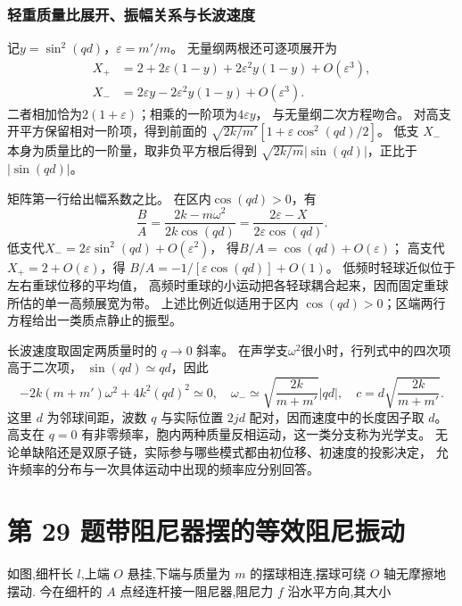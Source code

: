 \documentclass[UTF8,fontset=fandol,a4paper,11pt]{ctexart}
\newcommand{\tagline}[1]{\noindent{\small\color{muted}#1}\par}
\begin{document}
\subsubsection*{轻重质量比展开、振幅关系与长波速度}
记$y=\sin^2(qd)$，$\varepsilon=m'/m$。
无量纲两根还可逐项展开为
\[
\begin{aligned}
X_+&=2+2\varepsilon(1-y)+2\varepsilon^2y(1-y)+O(\varepsilon^3),\\
X_-&=2\varepsilon y-2\varepsilon^2y(1-y)+O(\varepsilon^3).
\end{aligned}
\]
二者相加恰为$2(1+\varepsilon)$；相乘的一阶项为$4\varepsilon y$，
与无量纲二次方程吻合。
对高支开平方保留相对一阶项，得到前面的
$\sqrt{2k/m'}[1+\varepsilon\cos^2(qd)/2]$。
低支 $X_-$ 本身为质量比的一阶量，取非负平方根后得到 $\sqrt{2k/m}|\sin(qd)|$，正比于 $|\sin(qd)|$。

矩阵第一行给出幅系数之比。
在区内$\cos(qd)>0$，有
\[
\frac BA=\frac{2k-m\omega^2}{2k\cos(qd)}
=\frac{2\varepsilon-X}{2\varepsilon\cos(qd)}.
\]
低支代$X_-=2\varepsilon\sin^2(qd)+O(\varepsilon^2)$，
得$B/A=\cos(qd)+O(\varepsilon)$；
高支代$X_+=2+O(\varepsilon)$，得
$B/A=-1/[\varepsilon\cos(qd)]+O(1)$。
低频时轻球近似位于左右重球位移的平均值，
高频时重球的小运动把各轻球耦合起来，因而固定重球所估的单一高频展宽为带。
上述比例近似适用于区内 $\cos(qd)>0$；区端两行方程给出一类质点静止的振型。

长波速度取固定两质量时的 $q\to0$ 斜率。
在声学支$\omega^2$很小时，行列式中的四次项高于二次项，
$\sin(qd)\simeq qd$，因此
\[
-2k(m+m')\omega^2+4k^2(qd)^2\simeq0,
\quad\omega_-\simeq\sqrt{\frac{2k}{m+m'}}|qd|,
\quad c=d\sqrt{\frac{2k}{m+m'}}.
\]
这里 $d$ 为邻球间距，波数 $q$ 与实际位置 $2jd$ 配对，因而速度中的长度因子取 $d$。高支在 $q=0$ 有非零频率，胞内两种质量反相运动，这一类分支称为光学支。
无论单缺陷还是双原子链，实际参与哪些模式都由初位移、初速度的投影决定，
允许频率的分布与一次具体运动中出现的频率应分别回答。




\section*{第 29 题\quad 带阻尼器摆的等效阻尼振动}

\tagline{M-07-29}

如图,细杆长 \(l\),上端 \(O\) 悬挂,下端与质量为 \(m\) 的摆球相连,摆球可绕
\(O\) 轴无摩擦地摆动. 今在细杆的 \(A\) 点经连杆接一阻尼器,阻尼力 \(f\)
沿水平方向,其大小
\end{document}
